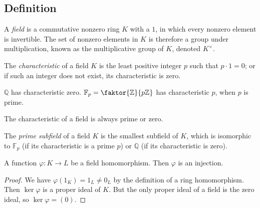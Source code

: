 \subsection{Definition}
\begin{definition}
	A \emph{field} is a commutative nonzero ring \( K \) with a \( 1 \), in which every nonzero element is invertible.
	The set of nonzero elements in \( K \) is therefore a group under multiplication, known as the multiplicative group of \( K \), denoted \( K^\times \).
\end{definition}
\begin{definition}
	The \emph{characteristic} of a field \( K \) is the least positive integer \( p \) such that \( p \cdot 1 = 0 \); or if such an integer does not exist, its characteristic is zero.
\end{definition}
\begin{example}
	\( \mathbb Q \) has characteristic zero.
	\( \mathbb F_p = \faktor{\mathbb Z}{p\mathbb Z} \) has characteristic \( p \), when \( p \) is prime.
\end{example}
\begin{remark}
	The characteristic of a field is always prime or zero.
\end{remark}
\begin{definition}
	The \emph{prime subfield} of a field \( K \) is the smallest subfield of \( K \), which is isomorphic to \( \mathbb F_p \) (if its characteristic is a prime \( p \)) or \( \mathbb Q \) (if its characteristic is zero).
\end{definition}
\begin{proposition}
	A function \( \varphi \colon K \to L \) be a field homomorphism.
	Then \( \varphi \) is an injection.
\end{proposition}
\begin{proof}
	We have \( \varphi(1_K) = 1_L \neq 0_L \) by the definition of a ring homomorphism.
	Then \( \ker \varphi \) is a proper ideal of \( K \).
	But the only proper ideal of a field is the zero ideal, so \( \ker \varphi = (0) \).
\end{proof}

